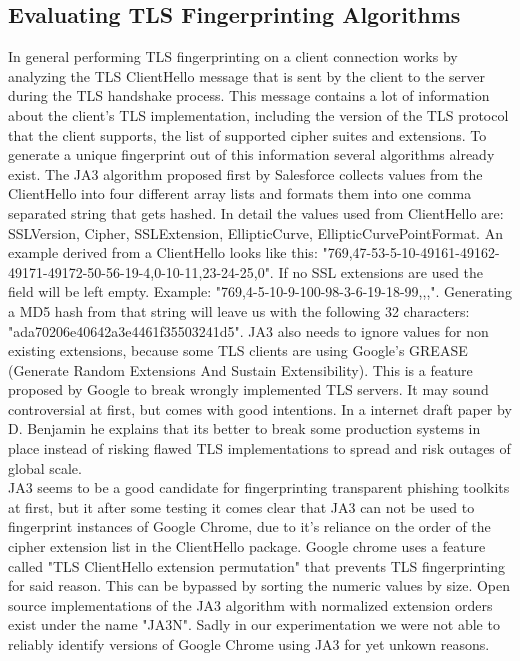 \documentclass[12pt]{report}
\begin{document}
\subsection{Evaluating TLS Fingerprinting Algorithms}
In general performing TLS fingerprinting on a client connection works by analyzing the TLS ClientHello message that is sent by the client to the server during the TLS handshake process. This message contains a lot of information about the client's TLS implementation, including the version of the TLS protocol that the client supports, the list of supported cipher suites and extensions. To generate a unique fingerprint out of this information several algorithms already exist. The JA3 algorithm proposed first by Salesforce \cite{ja3Salesforce} collects values from the ClientHello into four different array lists and formats them into one comma separated string that gets hashed. In detail the values used from ClientHello are: SSLVersion, Cipher, SSLExtension, EllipticCurve, EllipticCurvePointFormat. An example derived from a ClientHello looks like this: "769,47-53-5-10-49161-49162-49171-49172-50-56-19-4,0-10-11,23-24-25,0". If no SSL extensions are used the field will be left empty. Example: "769,4-5-10-9-100-98-3-6-19-18-99,,,". Generating a MD5 hash from that string will leave us with the following 32 characters: "ada70206e40642a3e4461f35503241d5". JA3 also needs to ignore values for non existing extensions, because some TLS clients are using Google’s GREASE (Generate Random Extensions And Sustain Extensibility). This is a feature proposed by Google to break wrongly implemented TLS servers. It may sound controversial at first, but comes with good intentions. In a internet draft paper by D. Benjamin \cite{greaseDraft} he explains that its better to break some production systems in place instead of risking flawed TLS implementations to spread and risk outages of global scale.\\JA3 seems to be a good candidate for fingerprinting transparent phishing toolkits at first, but it after some testing it comes clear that JA3 can not be used to fingerprint instances of Google Chrome, due to it's reliance on the order of the cipher extension list in the ClientHello package. Google chrome uses a feature called "TLS ClientHello extension permutation" that prevents TLS fingerprinting for said reason. This can be bypassed by sorting the numeric values by size. Open source implementations of the JA3 algorithm with normalized extension orders exist under the name "JA3N". Sadly in our experimentation we were not able to reliably identify versions of Google Chrome using JA3 for yet unkown reasons.\\ \\
\end{document}
